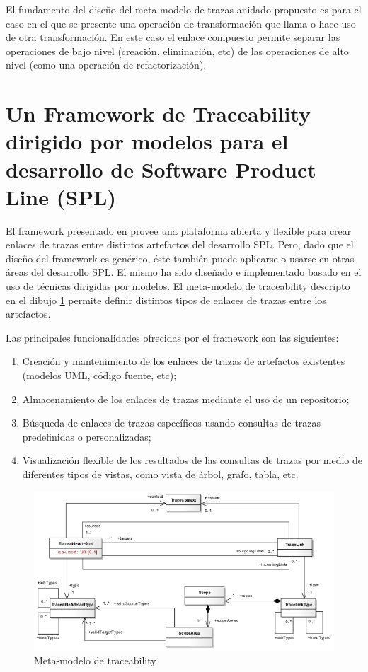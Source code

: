 \documentclass[a4paper,12pt,oneside]{book}
\begin{document}
El fundamento del diseño del meta-modelo de trazas anidado propuesto es para el caso en el que se presente una operación de transformación que llama o hace uso de otra transformación. En este caso el enlace compuesto permite separar las operaciones de bajo nivel (creación, eliminación, etc) de las operaciones de alto nivel (como una operación de refactorización).

\section{Un Framework  de Traceability dirigido por modelos para el desarrollo de Software Product Line (SPL)}

El framework presentado en \cite{SousaKuleszaRummlerAnquetilMitschkeMoreiraAmaralAraujo}  provee una plataforma abierta y flexible para crear enlaces de trazas entre distintos artefactos del desarrollo SPL. Pero, dado que el diseño del framework es genérico, éste también puede aplicarse o usarse en otras áreas del desarrollo SPL. El mismo ha sido diseñado e implementado basado en el uso de técnicas dirigidas por modelos. El meta-modelo de traceability descripto en el dibujo \ref{fig:SPLMeta-modelo} permite definir distintos tipos de enlaces de trazas entre los artefactos.

Las principales funcionalidades ofrecidas por el framework son las siguientes:

\begin{enumerate}
\item     Creación y mantenimiento de los enlaces de trazas de artefactos existentes (modelos UML, código fuente, etc);
\item    Almacenamiento de los enlaces de trazas mediante el uso de un repositorio;
\item    Búsqueda de enlaces de trazas específicos usando consultas de trazas predefinidas o personalizadas;
\item    Visualización flexible de los resultados de las consultas de trazas por medio de diferentes tipos de vistas, como vista de árbol, grafo, tabla, etc.
\end{enumerate}

\begin{figure}[hbtp]
\centering
\includegraphics[scale=.6]{./img/Traceability_Metamodel}
\caption{Meta-modelo de traceability}
\label{fig:SPLMeta-modelo}
\end{figure}
\end{document}
